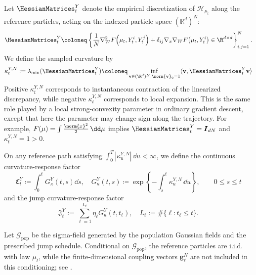 \begin{definition}
\label{def:curvature-responses}
Let  $\HessianMatrices_t^Y$ denote the empirical discretization of $\mathcal{H}_{\mu_t}$ along the
reference particles, acting on the indexed particle space $(\mathbb R^d)^N$:
\begin{equation}
    \HessianMatrices_t^Y\coloneq
    \left\{
    \frac{1}{N}
    \nabla_W^2 F\!\left(\mu_t,Y^i_t,Y^j_t\right)
    + \delta_{ij}\nabla_x\nabla_W F\!\left(\mu_t,Y^i_t\right)\in \R^{d\times d}\right\}_{i,j=1}^N.
\end{equation}
We define the sampled curvature by
\begin{equation}
    \kappa^{Y,N}_t := \lambda_{\min}(\HessianMatrices^Y_t) \coloneq 
    \inf_{\mathbf v \in (\R^d)^N, \norm{\mathbf v}_2=1}
    \langle \mathbf v,\HessianMatrices^Y_t \mathbf v\rangle
    \label{eq:curvature-main}
\end{equation}
Positive \(\kappa_t^{Y,N}\) corresponds to instantaneous contraction of the
linearized discrepancy, while negative \(\kappa_t^{Y,N}\) corresponds to local
expansion.  This is the same role played by a local strong-convexity parameter in
ordinary gradient descent, except that here the parameter may change sign along
the trajectory. For example, $F(\mu)=\int \frac{\norm{x}^2}{2}\,\dd\mu$ implies $\HessianMatrices_t^Y = \boldsymbol{I}_{dN}$ and $\kappa_t^{Y,N} = 1>0$.

On any reference path satisfying
\(\int_0^T|\kappa_u^{Y,N}|\,\dd u<\infty\), we define the continuous
curvature-response factor
\[
    \mathfrak C_t^Y
    \coloneq 
    \int_0^t
    G_\kappa^Y(t,s)
    \dd s ,\quad G_\kappa^Y(t,s)
    \coloneq 
    \exp\left\{-\int_s^t \kappa_u^{Y,N}\,\dd u\right\},
    \qquad 0\le s\le t
\]
and the jump curvature-response factor
\[
    \mathfrak J_t^Y
    :=
    \sum_{\ell=1}^{L_t}
    \eta_\ell
    G_\kappa^Y(t,t_\ell)
    ,\quad L_t:=\#\{\ell:t_\ell\le t\}.
\]
\end{definition}
\begin{remark}
Let \(\mathcal G_{\mathrm{pop}}\) be the sigma-field generated by the population
Gaussian fields and the prescribed jump schedule. Conditional on
\(\mathcal G_{\mathrm{pop}}\), the reference particles are i.i.d. with law
\(\mu_t\), while the finite-dimensional coupling vectors
\(\mathbf g_\ell^N\) are not included in this conditioning; see
.
\end{remark}


